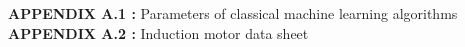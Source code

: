 \singlespacing
\textbf{APPENDIX A.1 :} Parameters of classical machine learning algorithms\\
\textbf{APPENDIX A.2 :} Induction motor data sheet\\





\newpage
